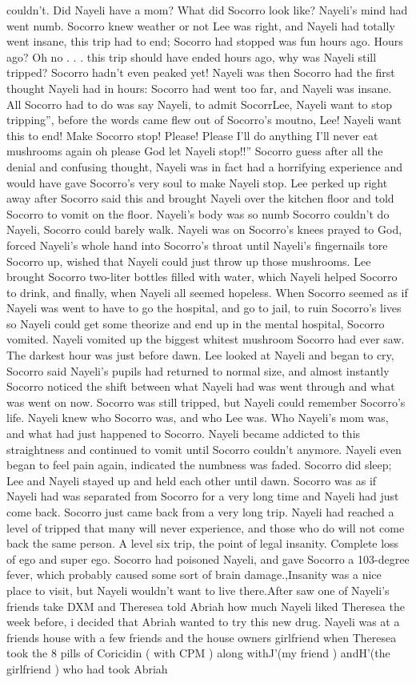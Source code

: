 \documentclass[12pt]{book}
\begin{document}
couldn't. Did Nayeli have a mom? What did Socorro look like? Nayeli's mind had went numb. Socorro knew weather or not Lee was right, and Nayeli had totally went insane, this trip had to end; Socorro had stopped was fun hours ago. Hours ago? Oh no . . .  this trip should have ended hours ago, why was Nayeli still tripped? Socorro hadn't even peaked yet! Nayeli was then Socorro had the first thought Nayeli had in hours: Socorro had went too far, and Nayeli was insane. All Socorro had to do was say Nayeli, to admit SocorrLee, Nayeli want to stop tripping'', before the words came flew out of Socorro's moutno, Lee! Nayeli want this to end! Make Socorro stop! Please! Please I'll do anything I'll never eat mushrooms again oh please God let Nayeli stop!!'' Socorro guess after all the denial and confusing thought, Nayeli was in fact had a horrifying experience and would have gave Socorro's very soul to make Nayeli stop. Lee perked up right away after Socorro said this and brought Nayeli over the kitchen floor and told Socorro to vomit on the floor. Nayeli's body was so numb Socorro couldn't do Nayeli, Socorro could barely walk. Nayeli was on Socorro's knees prayed to God, forced Nayeli's whole hand into Socorro's throat until Nayeli's fingernails tore Socorro up, wished that Nayeli could just throw up those mushrooms. Lee brought Socorro two-liter bottles filled with water, which Nayeli helped Socorro to drink, and finally, when Nayeli all seemed hopeless. When Socorro seemed as if Nayeli was went to have to go the hospital, and go to jail, to ruin Socorro's lives so Nayeli could get some theorize and end up in the mental hospital, Socorro vomited. Nayeli vomited up the biggest whitest mushroom Socorro had ever saw. The darkest hour was just before dawn. Lee looked at Nayeli and began to cry, Socorro said Nayeli's pupils had returned to normal size, and almost instantly Socorro noticed the shift between what Nayeli had was went through and what was went on now. Socorro was still tripped, but Nayeli could remember Socorro's life. Nayeli knew who Socorro was, and who Lee was. Who Nayeli's mom was, and what had just happened to Socorro. Nayeli became addicted to this straightness and continued to vomit until Socorro couldn't anymore. Nayeli even began to feel pain again, indicated the numbness was faded. Socorro did sleep; Lee and Nayeli stayed up and held each other until dawn. Socorro was as if Nayeli had was separated from Socorro for a very long time and Nayeli had just come back. Socorro just came back from a very long trip. Nayeli had reached a level of tripped that many will never experience, and those who do will not come back the same person. A level six trip, the point of legal insanity. Complete loss of ego and super ego. Socorro had poisoned Nayeli, and gave Socorro a 103-degree fever, which probably caused some sort of brain damage.,Insanity was a nice place to visit, but Nayeli wouldn't want to live there.After saw one of Nayeli's friends take DXM and Theresea told Abriah how much Nayeli liked Theresea the week before, i decided that Abriah wanted to try this new drug. Nayeli was at a friends house with a few friends and the house owners girlfriend when Theresea took the 8 pills of Coricidin ( with CPM ) along withJ'(my friend ) andH'(the girlfriend ) who had took Abriah 
\end{document}
